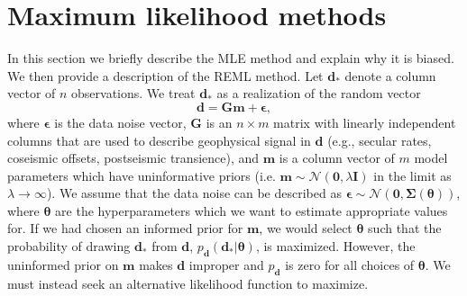 \documentclass{svjour3}                     %
\begin{document}
\section{Maximum likelihood methods}\label{sec:2}
In this section we briefly describe the MLE method and explain why it is biased. We then provide a description of the REML method. Let $\mathbf{d_*}$ denote a column vector of $n$ observations. We treat $\mathbf{d_*}$ as a realization of the random vector
\begin{equation}
  \mathbf{d} = \mathbf{Gm} + \mathbf{\epsilon},
\end{equation}
where $\mathbf{\epsilon}$ is the data noise vector, $\mathbf{G}$ is an $n \times m$ matrix with linearly independent columns that are used to describe geophysical signal in $\mathbf{d}$ (e.g., secular rates, coseismic offsets, postseismic transience), and $\mathbf{m}$ is a column vector of $m$ model parameters which have uninformative priors (i.e. $\mathbf{m} \sim \mathcal{N}(\mathbf{0},\lambda\mathbf{I})$ in the limit as $\lambda \to \infty$).  We assume that the data noise can be described as $\mathbf{\epsilon} \sim \mathcal{N}(\mathbf{0},\mathbf{\Sigma}(\mathbf{\theta}))$, where $\mathbf{\theta}$ are the hyperparameters which we want to estimate appropriate values for. If we had chosen an informed prior for $\mathbf{m}$, we would select $\mathbf{\theta}$ such that the probability of drawing $\mathbf{d_*}$ from $\mathbf{d}$, $p_\mathbf{d}(\mathbf{d_*}|\mathbf{\theta})$, is maximized. However, the uninformed prior on $\mathbf{m}$ makes $\mathbf{d}$ improper and $p_\mathbf{d}$ is zero for all choices of $\mathbf{\theta}$. We must instead seek an alternative likelihood function to maximize. 
\end{document}
